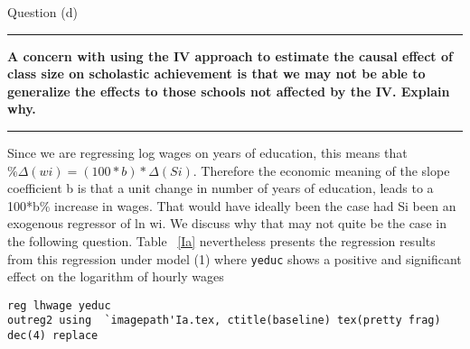 \documentclass[12pt]{article}
\newcommand\question[1]{\vspace{1em}\hrule\vspace{1em}\textbf{#1}\vspace{1em}\hrule\vspace{1em}}
\begin{document}
\newpage
\begin{center}\LARGE{Question (d)}\end{center}
\question{A concern with using the IV approach to estimate the causal effect of class size on scholastic achievement is that we may not be able to generalize the effects to those schools not affected by the IV. Explain why.}
Since we are regressing log wages on years of education, this means that $\%\Delta(wi) = (100*b)*\Delta(Si)$. Therefore the  economic meaning of the slope coefficient b is that a unit change in number of years of education, leads to a 100*b\% increase in wages. That would have ideally been the case had Si been an exogenous regressor of ln wi. We discuss why that may not quite be the case in the following question. Table ~\ref{Ia} nevertheless presents the regression  results from this regression under model (1) where \verb|yeduc| shows a positive and significant effect on the logarithm of hourly wages
\begin{lstlisting}
reg lhwage yeduc
outreg2 using  `imagepath'Ia.tex, ctitle(baseline) tex(pretty frag) dec(4) replace
\end{lstlisting}


 

\end{document}
